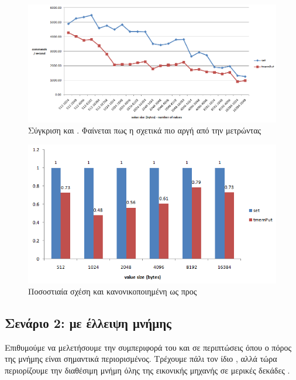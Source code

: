 \begin{figure}[h]
  \includegraphics[width=\textwidth]{pictures/firstBenchmarkResults.PNG}
  \caption{Σύγκριση  και . Φαίνεται πως
  η  σχετικά πιο αργή από την  μετρώντας
  }
  \label{fig:tmemPut-Set}
\end{figure}

\begin{figure}[h]
  \includegraphics[width=\textwidth]{pictures/firstBenchmarkResults2.PNG}
  \caption{Ποσοστιαία σχέση  και  κανονικοποιημένη ως προς }
  \label{fig:tmemPut-SetPercentage}
\end{figure}


\subsection{Σενάριο 2: με έλλειψη μνήμης}

Επιθυμούμε να μελετήσουμε την συμπεριφορά του  και σε περιπτώσεις
όπου ο πόρος της μνήμης είναι σημαντικά περιορισμένος. Τρέχουμε πάλι τον ίδιο
, αλλά τώρα περιορίζουμε την διαθέσιμη μνήμη όλης της εικονικής
μηχανής σε μερικές δεκάδες .
\newline

